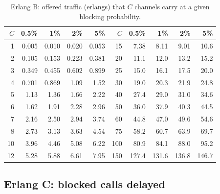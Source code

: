 \begin{table}[htbp]\centering\small
\caption{Erlang B: offered traffic (erlangs) that $C$ channels carry at a given blocking probability.}
\label{tab:ch20:erlangb}
\begin{tabular}{@{}r rrrr @{\hspace{2.5em}} r rrrr@{}}
\toprule
$C$ & 0.5\% & 1\% & 2\% & 5\% & $C$ & 0.5\% & 1\% & 2\% & 5\%\\
\midrule
1 & 0.005 & 0.010 & 0.020 & 0.053 & 15 & 7.38 & 8.11 & 9.01 & 10.6\\
2 & 0.105 & 0.153 & 0.223 & 0.381 & 20 & 11.1 & 12.0 & 13.2 & 15.2\\
3 & 0.349 & 0.455 & 0.602 & 0.899 & 25 & 15.0 & 16.1 & 17.5 & 20.0\\
4 & 0.701 & 0.869 & 1.09 & 1.52 & 30 & 19.0 & 20.3 & 21.9 & 24.8\\
5 & 1.13 & 1.36 & 1.66 & 2.22 & 40 & 27.4 & 29.0 & 31.0 & 34.6\\
6 & 1.62 & 1.91 & 2.28 & 2.96 & 50 & 36.0 & 37.9 & 40.3 & 44.5\\
7 & 2.16 & 2.50 & 2.94 & 3.74 & 60 & 44.8 & 47.0 & 49.6 & 54.6\\
8 & 2.73 & 3.13 & 3.63 & 4.54 & 75 & 58.2 & 60.7 & 63.9 & 69.7\\
10 & 3.96 & 4.46 & 5.08 & 6.22 & 100 & 80.9 & 84.1 & 88.0 & 95.2\\
12 & 5.28 & 5.88 & 6.61 & 7.95 & 150 & 127.4 & 131.6 & 136.8 & 146.7\\
\bottomrule
\end{tabular}
\end{table}

\subsection{Erlang C: blocked calls delayed}

